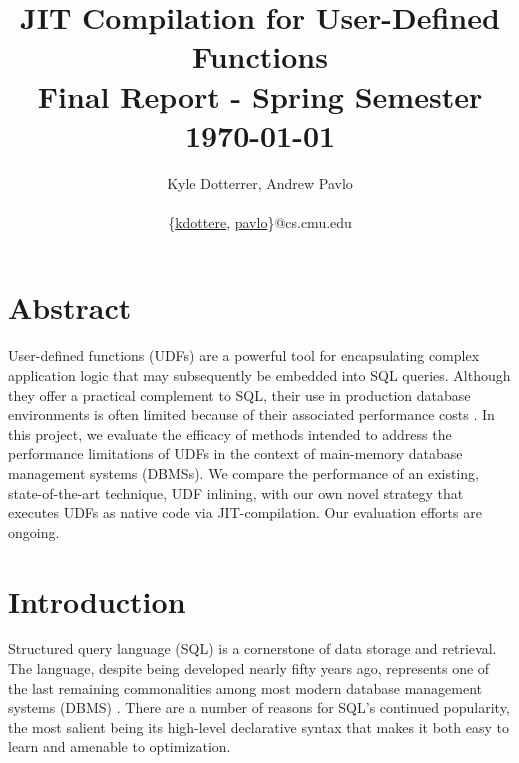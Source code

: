 \documentclass{vldb}
\newcommand{\paperTitle}{JIT Compilation for User-Defined Functions\\ 
    \large Final Report - Spring Semester\\
    \today}
\begin{document}
\title{\paperTitle}

\author{
    \alignauthor Kyle Dotterrer, Andrew Pavlo\\
    \\
    \email 
        \{\href{mailto:kdottere@cs.cmu.edu}{kdottere},
        \href{mailto:pavlo@cs.cmu.edu}{pavlo}\}@cs.cmu.edu\\
}

\makeatletter
\def\@copyrightspace{\relax}
\makeatother

\maketitle


\section*{Abstract}

User-defined functions (UDFs) are a powerful tool for encapsulating complex application logic that may subsequently be embedded into SQL queries. Although they offer a practical complement to SQL, their use in production database environments is often limited because of their associated performance costs \cite{froid, apfel}. In this project, we evaluate the efficacy of methods intended to address the performance limitations of UDFs in the context of main-memory database management systems (DBMSs). We compare the performance of an existing, state-of-the-art technique, UDF inlining, with our own novel strategy that executes UDFs as native code via JIT-compilation. Our evaluation efforts are ongoing.


\section{Introduction}

Structured query language (SQL) is a cornerstone of data storage and retrieval. The language, despite being developed nearly fifty years ago, represents one of the last remaining commonalities among most modern database management systems (DBMS) \cite{codd1970}. There are a number of reasons for SQL's continued popularity, the most salient being its high-level declarative syntax that makes it both easy to learn and amenable to optimization.
\end{document}
